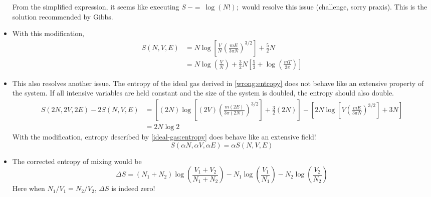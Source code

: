 \documentclass{article}
\begin{document}
\begin{itemize}
    From the simplified expression, it seems like executing $S\:-=\:\log(N!);$ would resolve this issue (challenge, sorry praxis). This is the solution recommended by Gibbs.
    \item With this modification,
    \begin{align}
        S(N,V,E)&=N\log\left[\frac{V}{N}\left(\frac{mE}{3\pi N}\right)^{3/2}\right]+\frac{5}{2}N\label{ideal-gas:entropy}\\ 
        &=N\log\left(\frac{V}{N}\right)+\frac{3}{2}N\left[\frac{5}{3}+\log(\frac{mT}{2\pi})\right]
    \end{align}
    \item This also resolves another issue. The entropy of the ideal gas derived in \eqref{wrong:entropy} does not behave like an extensive property of the system. If all intensive variables are held constant and the size of the system is doubled, the entropy should also double. 
    \begin{equation}
        \begin{aligned}
            S(2N,2V,2E)-2S(N,V,E)&=\left[(2N)\log\left[(2V)\left(\frac{m(2E)}{3\pi(2N)}\right)^{3/2}\right]+\frac{3}{2}(2N)\right]-\left[2N\log\left[V\left(\frac{mE}{3\pi N}\right)^{3/2}\right]+3N\right]
            \\&=2N\log 2
        \end{aligned}
    \end{equation}
    With the modification, entropy described by \eqref{ideal-gas:entropy} does behave like an extensive field!
    \begin{equation}
        S(\alpha N,\alpha V, \alpha E)=\alpha S(N,V,E)
    \end{equation}
    \item The corrected entropy of mixing would be
    \begin{equation}
        \Delta S=(N_1+N_2)\log\left(\frac{V_1+V_2}{N_1+N_2}\right)-N_1\log\left(\frac{V_1}{N_1}\right)-N_2\log\left(\frac{V_2}{N_2}\right)
    \end{equation}
    Here when $N_1/V_1=N_2/V_2$, $\Delta S$ is indeed zero!
\end{itemize}
\end{document}

